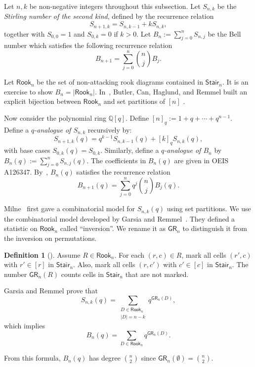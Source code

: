 \documentclass[10pt]{amsart}
\theoremstyle{plain}
\theoremstyle{plain}
\theoremstyle{definition}
\theoremstyle{definition}
\newtheorem{defn}[defn]{Definition}
\theoremstyle{definition}
\theoremstyle{plain}
\theoremstyle{plain}
\theoremstyle{plain}
\theoremstyle{plain}
\theoremstyle{plain}
\theoremstyle{remark}
\theoremstyle{remark}
\theoremstyle{plain}
\theoremstyle{plain}
\newcommand{\Q}{\mathbb{Q}}
\newcommand{\Rook}{\mathsf{Rook}}
\newcommand{\Stair}{\mathsf{Stair}}
\newcommand{\GR}{\mathsf{GR}}
\newcommand{\definition}[1]{{\color{darkred}\emph{#1}}}
\begin{document}
Let $n, k$ be non-negative integers
throughout this subsection. 
Let $S_{n, k}$ be the \definition{Stirling number
of the second kind},
defined by the recurrence relation
$$
S_{n+1,k} = S_{n, k - 1} + k S_{n, k},
$$
together with $S_{0, 0} = 1$
and $S_{0,k} = 0$ if $k > 0$.
Let $B_n:= \sum_{j = 0}^n S_{n,j}$
be the Bell number
which satisfies the following recurrence relation
$$
B_{n + 1} = \sum_{j = 0}^n {\binom{n}{j}} B_j.
$$
 
Let $\Rook_n$ be the set 
of non-attacking rook diagrams contained 
in $\Stair_n$.
It is an exercise to show
$B_n = |\Rook_n|$.
In~\cite{BCHR},
Butler, Can, Haglund, and Remmel
built an explicit bijection between
$\Rook_n$ and set partitions of $[n]$ .

Now consider the polynomial ring $\Q[q]$.
Define $[n]_q := 1 + q + \cdots + q^{n-1}$.
Define a \definition{$q$-analogue of $S_{n,k}$} recursively by:
$$
S_{n+1, k}(q) = q^{k-1} S_{n, k-1}(q) + [k]_q S_{n, k}(q),
$$
with base cases $S_{0, k}(q) = S_{0,k}$.
Similarly, define a \definition{$q$-analogue of $B_n$} by $B_n(q) := \sum_{j = 0}^n S_{n,j}(q)$.
The coefficients in $B_{n}(q)$
are given in OEIS A126347.
By~\cite{Wa},
$B_n(q)$ satisfies the recurrence relation
$$
B_{n+1}(q) = \sum_{j = 0}^n q^j {\binom{n}{j}} B_j(q).
$$



Milne~\cite{Mil} first gave a combinatorial
model for $S_{n,k}(q)$ using set partitions. 
We use the combinatorial model
developed by Garsia and Remmel~\cite{GR}.
They defined a statistic on $\Rook_n$
called ``inversion''.
We rename it as $\GR_n$ to distinguish it 
from the inversion on permutations. 
\begin{defn}[\cite{GR}]
Assume $R \in \Rook_n$.
For each $(r,c) \in R$,
mark all cells $(r', c)$ with $r' \in [r]$ in $\Stair_n$.
Also, mark all cells $(r, c')$ with $c' \in [c]$ in $\Stair_n$.
The number $\GR_n(R)$ counts cells in $\Stair_n$
that are not marked. 
\end{defn}

Garsia and Remmel prove that
\begin{equation}
\label{EQ: GR Stirling}
S_{n,k}(q) = \sum_{\substack{D \in \Rook_{n}\\ |D| = n-k}} q^{\GR_n(D)},
\end{equation}
which implies
\begin{equation}
\label{EQ: GR Bell}
B_n(q) = \sum_{D \in \Rook_n} q^{\GR_n(D)}.
\end{equation}

From this formula, $B_n(q)$ has degree ${\binom{n}{2}}$
since $\GR_n(\emptyset) = {\binom{n}{2}}$.
\end{document}
